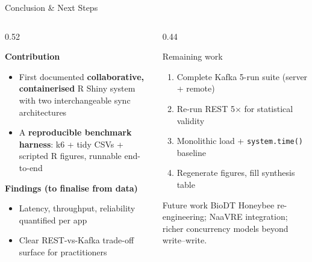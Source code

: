 \documentclass[aspectratio=169]{beamer}
\begin{document}
\begin{frame}{Conclusion \& Next Steps}

\begin{columns}[T]
\begin{column}{0.52\textwidth}

\textbf{Contribution}
\begin{itemize}
    \item First documented \textbf{collaborative, containerised} R Shiny
          system with two interchangeable sync architectures
    \item A \textbf{reproducible benchmark harness}: k6 + tidy CSVs +
          scripted R figures, runnable end-to-end
\end{itemize}

\vspace{0.5em}
\textbf{Findings (to finalise from data)}
\begin{itemize}
    \item Latency, throughput, reliability quantified per app
    \item Clear REST-vs-Kafka trade-off surface for practitioners
\end{itemize}

\end{column}
\begin{column}{0.44\textwidth}

\begin{block}{Remaining work}
\small
\begin{enumerate}
    \item Complete Kafka 5-run suite (server + remote)
    \item Re-run REST 5$\times$ for statistical validity
    \item Monolithic load + \texttt{system.time()} baseline
    \item Regenerate figures, fill synthesis table
\end{enumerate}
\end{block}

\vspace{0.5em}
\begin{exampleblock}{Future work}
\small
BioDT Honeybee re-engineering; NaaVRE integration; richer concurrency
models beyond write--write.
\end{exampleblock}

\end{column}
\end{columns}

\end{frame}
\end{document}
